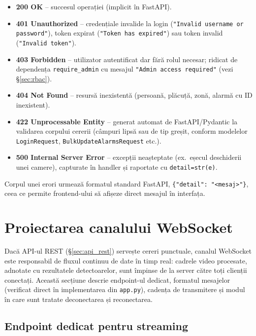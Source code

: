 \documentclass[../../main.tex]{subfiles}
\begin{document}
\begin{itemize}
    \item \textbf{200 OK} -- succesul operației (implicit în FastAPI).
    \item \textbf{401 Unauthorized} -- credențiale invalide la login (\texttt{"Invalid username or password"}), token expirat (\texttt{"Token has expired"}) sau token invalid (\texttt{"Invalid token"}).
    \item \textbf{403 Forbidden} -- utilizator autentificat dar fără rolul necesar; ridicat de dependența \texttt{require\_admin} cu mesajul \texttt{"Admin access required"} (vezi \S\ref{sec:rbac}).
    \item \textbf{404 Not Found} -- resursă inexistentă (persoană, plăcuță, zonă, alarmă cu ID inexistent).
    \item \textbf{422 Unprocessable Entity} -- generat automat de FastAPI/Pydantic la validarea corpului cererii (câmpuri lipsă sau de tip greșit, conform modelelor \texttt{LoginRequest}, \texttt{BulkUpdateAlarmsRequest} etc.).
    \item \textbf{500 Internal Server Error} -- excepții neașteptate (ex.\ eșecul deschiderii unei camere), capturate în handler și raportate cu \texttt{detail=str(e)}.
\end{itemize}

Corpul unei erori urmează formatul standard FastAPI, \texttt{\{"detail": \linebreak "<mesaj>"\}}, ceea ce permite frontend-ului să afișeze direct mesajul în interfața.

\section{Proiectarea canalului WebSocket}
\label{sec:proiectare_websocket}

Dacă API-ul REST (\S\ref{sec:api_rest}) servește cereri punctuale, canalul WebSocket este responsabil de fluxul continuu de date în timp real: cadrele video procesate, adnotate cu rezultatele detectoarelor, sunt împinse de la server către toți clienții conectați. Această secțiune descrie endpoint-ul dedicat, formatul mesajelor (verificat direct în implementarea din \texttt{app.py}), cadența de transmitere și modul în care sunt tratate deconectarea și reconectarea.

\subsection{Endpoint dedicat pentru streaming}
\end{document}
